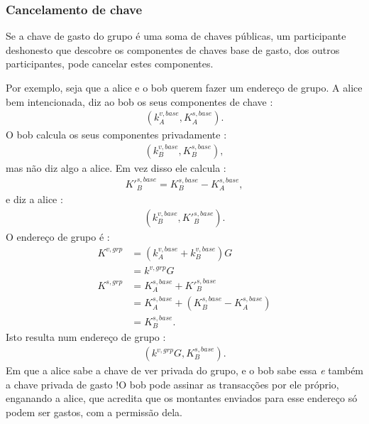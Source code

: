 \subsubsection*{Cancelamento de chave}

Se a chave de gasto do grupo é uma soma de chaves públicas, um participante deshonesto que descobre os componentes de chaves base de gasto, dos outros participantes, pode cancelar estes componentes.

Por exemplo, seja que a alice e o bob querem fazer um endereço de grupo. A alice bem intencionada, diz ao bob os seus componentes de chave : 
\begin{align*} 
(k^{v,base}_A,K^{s,base}_A) .
\end{align*}
O bob calcula os seus componentes privadamente :
\begin{align*}
(k^{v,base}_B,K^{s,base}_B) ,
\end{align*}
mas não diz algo a alice. Em vez disso ele calcula :
\begin{align*}
K'^{s,base}_B = K^{s,base}_B - K^{s,base}_A ,
\end{align*}
e diz a alice :
\begin{align*}
(k^{v,base}_B,K'^{s,base}_B) .
\end{align*}
O endereço de grupo é :
\begin{align*}
    K^{v,grp} &= (k^{v,base}_A + k^{v,base}_B) G \\
             &= k^{v,grp} G\\
    K^{s,grp} &= K^{s,base}_A + K'^{s,base}_B \\
             &= K^{s,base}_A + (K^{s,base}_B - K^{s,base}_A)\\
             &= K^{s,base}_B .
\end{align*}
Isto resulta num endereço de grupo : 
\begin{align*}
(k^{v,grp} G,K^{s,base}_B) .
\end{align*}
Em que a alice sabe a chave de ver privada do grupo, e o bob sabe essa {\em e} também a chave privada de gasto !\newline O bob pode assinar as transacções por ele próprio, enganando a alice, que acredita que os montantes enviados para esse endereço só podem ser gastos, com a permissão dela.

